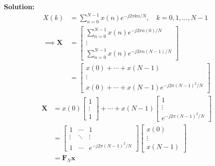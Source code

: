 \documentclass[journal,12pt,twocolumn]{IEEEtran}
\newcommand{\solution}{\noindent \textbf{Solution: }}
\let\vec\mathbf
\numberwithin{equation}{section}
\renewcommand\thesection{\arabic{section}}
\newcommand{\mymat}[1]{\ensuremath{\begin{bmatrix}#1\end{bmatrix}}}
\begin{document}
\begin{enumerate}[label=\thesection.\arabic*]
	\solution
	\begin{align}
        X(k) &= \sum_{n=0}^{N-1} x(n) e^{-j 2 \pi k n / N}, \quad k=0,1, \ldots, N-1 \\
        \implies \vec{X} &= \mymat{\sum_{n=0}^{N-1} x(n) e^{-j 2 \pi  n (0) / N} \\ \vdots \\ \sum_{n=0}^{N-1} x(n) e^{-j 2 \pi  n (N-1) / N}} \\
        &= \mymat{x(0) + \cdots + x(N-1) \\ \vdots \\ x(0) + \cdots + x(N-1) e^{-j 2 \pi (N-1)^2 / N}} 
    \end{align}
    \begin{align}
    		\vec{X} &= x(0) \mymat{1 \\ \vdots \\ 1} + \cdots + x(N-1)\mymat{1 \\ \vdots \\ e^{-j 2 \pi (N-1)^2 / N}} \\
    		&= \mymat{1 & \cdots & 1 \\ \vdots & \ddots & \vdots \\ 1 & \cdots & e^{-j 2 \pi (N-1)^2 / N}} \mymat{x(0) \\ \vdots \\ x(N-1)} \\
    		&= \vec{F}_N \vec{x}
    \end{align}
		

\end{enumerate}
\end{document}
